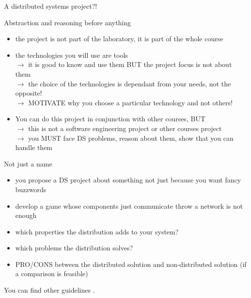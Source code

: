\documentclass[presentation]{beamer}\mode<presentation>{\usetheme{AMSBolognaFC}}
\begin{document}
\begin{frame}[c,allowframebreaks]{A distributed systems project?!}
    \begin{block}{Abstraction and reasoning before anything}
        \begin{itemize}
            \item the project is not part of the laboratory, it is part of the whole course
            \item the technologies you will use are tools
            \\
            $\rightarrow$ it is good to know and use them \alert{BUT} the project focus is not about them
            \\
            $\rightarrow$ the choice of the technologies is dependant from your needs, not the opposite!
            \\
            $\rightarrow$ \alert{MOTIVATE} why you choose a particular technology and not others!
            \item You can do this project in conjunction with other courses, \alert{BUT}
            \\
            $\rightarrow$ this is not a software engineering project or other courses project 
            \\
            $\rightarrow$ you \alert{MUST} face DS problems, reason about them, show that you can handle them
        \end{itemize}
    \end{block}
    
    \framebreak
    
    \begin{block}{Not just a name}
        \begin{itemize}
            \item you propose a DS project about something not just because you want fancy buzzwords
            \item develop a game whose components just communicate throw a network is not enough
            \item which properties the distribution adds to your system?
            \item which problems the distribution solves?
            \item PRO/CONS between the distributed solution and non-distributed solution (if a comparison is feasible)
        \end{itemize}
    \end{block}
    You can find other guidelines .
    
\end{frame}
\end{document}
